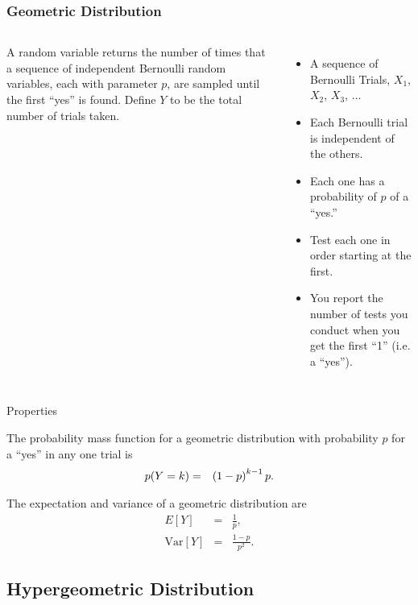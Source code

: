 \begin{frame}
  \frametitle{Geometric Distribution}

  \begin{columns}
    \begin{definition}
      A  random variable returns the number of
      times that a sequence of independent Bernoulli random variables,
      each with parameter $p$, are sampled until the first ``yes''
      is found. Define $Y$ to be the total number of trials taken.
    \end{definition}
      \begin{itemize}
      \item A sequence of Bernoulli Trials, $X_1$, $X_2$, $X_3$,
        $\ldots$
      \item Each Bernoulli trial is independent of the others.
      \item Each one has a probability of $p$ of a ``yes.''
      \item Test each one in order starting at the first.
      \item You report the number of tests you conduct when you get
        the first ``1'' (i.e. a ``yes'').
      \end{itemize}
  \end{columns}

\end{frame}

\begin{frame}{Properties}

  The probability mass function for a geometric distribution with
  probability $p$ for a ``yes'' in any one trial is
  \begin{eqnarray*}
    p(Y=k) & = & \left( 1-p\right)^{k-1} p.
  \end{eqnarray*}

  The expectation and variance of a geometric distribution are
  \begin{eqnarray*}
    E[Y] & = & \frac{1}{p}, \\
    \mathrm{Var}[Y] & = & \frac{1-p}{p^2}.
  \end{eqnarray*}

\end{frame}

\subsection{Hypergeometric Distribution}

